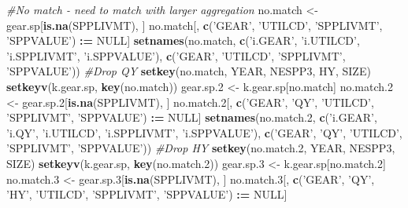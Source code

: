 \documentclass[]{article}
\newenvironment{Shaded}{\begin{snugshade}}{\end{snugshade}}
\newcommand{\KeywordTok}[1]{\textcolor[rgb]{0.13,0.29,0.53}{\textbf{#1}}}
\newcommand{\DecValTok}[1]{\textcolor[rgb]{0.00,0.00,0.81}{#1}}
\newcommand{\StringTok}[1]{\textcolor[rgb]{0.31,0.60,0.02}{#1}}
\newcommand{\CommentTok}[1]{\textcolor[rgb]{0.56,0.35,0.01}{\textit{#1}}}
\newcommand{\OtherTok}[1]{\textcolor[rgb]{0.56,0.35,0.01}{#1}}
\newcommand{\OperatorTok}[1]{\textcolor[rgb]{0.81,0.36,0.00}{\textbf{#1}}}
\newcommand{\ErrorTok}[1]{\textcolor[rgb]{0.64,0.00,0.00}{\textbf{#1}}}
\newcommand{\NormalTok}[1]{#1}
\begin{document}
\begin{Shaded}
\begin{Highlighting}[]
  \CommentTok{#No match - need to match with larger aggregation}
\NormalTok{  no.match  <-}\StringTok{ }\NormalTok{gear.sp[}\KeywordTok{is.na}\NormalTok{(SPPLIVMT), ]}
\NormalTok{  no.match[, }\KeywordTok{c}\NormalTok{(}\StringTok{'GEAR'}\NormalTok{, }\StringTok{'UTILCD'}\NormalTok{, }\StringTok{'SPPLIVMT'}\NormalTok{, }\StringTok{'SPPVALUE'}\NormalTok{) }\OperatorTok{:}\ErrorTok{=}\StringTok{ }\OtherTok{NULL}\NormalTok{]}
  \KeywordTok{setnames}\NormalTok{(no.match, }\KeywordTok{c}\NormalTok{(}\StringTok{'i.GEAR'}\NormalTok{, }\StringTok{'i.UTILCD'}\NormalTok{, }\StringTok{'i.SPPLIVMT'}\NormalTok{, }\StringTok{'i.SPPVALUE'}\NormalTok{), }
           \KeywordTok{c}\NormalTok{(}\StringTok{'GEAR'}\NormalTok{, }\StringTok{'UTILCD'}\NormalTok{, }\StringTok{'SPPLIVMT'}\NormalTok{, }\StringTok{'SPPVALUE'}\NormalTok{))}
  \CommentTok{#Drop QY}
  \KeywordTok{setkey}\NormalTok{(no.match, YEAR, NESPP3, HY, SIZE)}
  \KeywordTok{setkeyv}\NormalTok{(k.gear.sp, }\KeywordTok{key}\NormalTok{(no.match))}
\NormalTok{  gear.sp.}\DecValTok{2}\NormalTok{ <-}\StringTok{ }\NormalTok{k.gear.sp[no.match]}
\NormalTok{  no.match.}\DecValTok{2}\NormalTok{ <-}\StringTok{ }\NormalTok{gear.sp.}\DecValTok{2}\NormalTok{[}\KeywordTok{is.na}\NormalTok{(SPPLIVMT), ]}
\NormalTok{  no.match.}\DecValTok{2}\NormalTok{[, }\KeywordTok{c}\NormalTok{(}\StringTok{'GEAR'}\NormalTok{, }\StringTok{'QY'}\NormalTok{, }\StringTok{'UTILCD'}\NormalTok{, }\StringTok{'SPPLIVMT'}\NormalTok{, }\StringTok{'SPPVALUE'}\NormalTok{) }\OperatorTok{:}\ErrorTok{=}\StringTok{ }\OtherTok{NULL}\NormalTok{]}
  \KeywordTok{setnames}\NormalTok{(no.match.}\DecValTok{2}\NormalTok{, }\KeywordTok{c}\NormalTok{(}\StringTok{'i.GEAR'}\NormalTok{, }\StringTok{'i.QY'}\NormalTok{, }\StringTok{'i.UTILCD'}\NormalTok{, }\StringTok{'i.SPPLIVMT'}\NormalTok{, }\StringTok{'i.SPPVALUE'}\NormalTok{), }
           \KeywordTok{c}\NormalTok{(}\StringTok{'GEAR'}\NormalTok{, }\StringTok{'QY'}\NormalTok{, }\StringTok{'UTILCD'}\NormalTok{, }\StringTok{'SPPLIVMT'}\NormalTok{, }\StringTok{'SPPVALUE'}\NormalTok{))}
  \CommentTok{#Drop HY}
  \KeywordTok{setkey}\NormalTok{(no.match.}\DecValTok{2}\NormalTok{, YEAR, NESPP3, SIZE)}
  \KeywordTok{setkeyv}\NormalTok{(k.gear.sp, }\KeywordTok{key}\NormalTok{(no.match.}\DecValTok{2}\NormalTok{))}
\NormalTok{  gear.sp.}\DecValTok{3}\NormalTok{ <-}\StringTok{ }\NormalTok{k.gear.sp[no.match.}\DecValTok{2}\NormalTok{]}
\NormalTok{  no.match.}\DecValTok{3}\NormalTok{ <-}\StringTok{ }\NormalTok{gear.sp.}\DecValTok{3}\NormalTok{[}\KeywordTok{is.na}\NormalTok{(SPPLIVMT), ]}
\NormalTok{  no.match.}\DecValTok{3}\NormalTok{[, }\KeywordTok{c}\NormalTok{(}\StringTok{'GEAR'}\NormalTok{, }\StringTok{'QY'}\NormalTok{, }\StringTok{'HY'}\NormalTok{, }\StringTok{'UTILCD'}\NormalTok{, }\StringTok{'SPPLIVMT'}\NormalTok{, }\StringTok{'SPPVALUE'}\NormalTok{) }\OperatorTok{:}\ErrorTok{=}\StringTok{ }\OtherTok{NULL}\NormalTok{]}

\end{Highlighting}
\end{Shaded}
\end{document}
